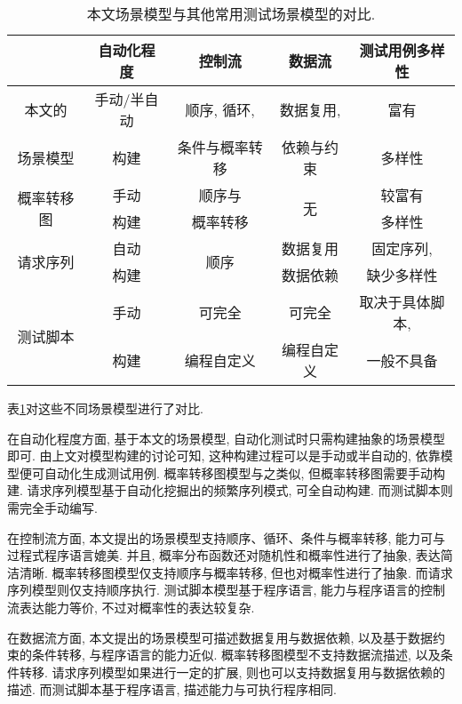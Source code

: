         \begin{table}[!htb]
            \centering
            \begin{tabular}{ccccc}
                \toprule
                 & 自动化程度 & 控制流 & 数据流 & 测试用例多样性 \\
                \midrule
                本文的 & 手动/半自动 & 顺序, 循环,  & 数据复用, & 富有 \\
                场景模型   & 构建 & 条件与概率转移 & 依赖与约束 & 多样性 \\
                \hline
                \multirow{2}{*}{概率转移图\cite{junyiw17}} & 手动 & 顺序与 & \multirow{2}{*}{无} & 较富有 \\
                & 构建 & 概率转移 &  & 多样性 \\
                \hline
                \multirow{2}{*}{请求序列\cite{taox06}\cite{xiaodongg16}} & 自动 & \multirow{2}{*}{顺序} & 数据复用 & 固定序列, \\
                & 构建 &  & 数据依赖 & 缺少多样性 \\
                \hline
                \multirow{2}{*}{测试脚本} & 手动 & 可完全 & 可完全 & 取决于具体脚本, \\
                & 构建 & 编程自定义 & 编程自定义 & 一般不具备 \\
                \bottomrule
            \end{tabular}
            \caption[本文场景模型与其他常用场景模型对比表]{本文场景模型与其他常用测试场景模型的对比.}
            \label{tab:related_work_compare}
        \end{table}
        
        表\ref{tab:related_work_compare}对这些不同场景模型进行了对比. 
        
        在自动化程度方面, 基于本文的场景模型, 自动化测试时只需构建抽象的场景模型即可. 由上文对模型构建的讨论可知, 这种构建过程可以是手动或半自动的, 依靠模型便可自动化生成测试用例. 概率转移图模型与之类似, 但概率转移图需要手动构建. 请求序列模型基于自动化挖掘出的频繁序列模式, 可全自动构建. 而测试脚本则需完全手动编写.
            
        在控制流方面, 本文提出的场景模型支持顺序、循环、条件与概率转移, 能力可与过程式程序语言媲美. 并且, 概率分布函数还对随机性和概率性进行了抽象, 表达简洁清晰. 概率转移图模型仅支持顺序与概率转移, 但也对概率性进行了抽象. 而请求序列模型则仅支持顺序执行. 测试脚本模型基于程序语言, 能力与程序语言的控制流表达能力等价, 不过对概率性的表达较复杂.
            
        在数据流方面, 本文提出的场景模型可描述数据复用与数据依赖, 以及基于数据约束的条件转移, 与程序语言的能力近似. 概率转移图模型不支持数据流描述, 以及条件转移. 请求序列模型如果进行一定的扩展, 则也可以支持数据复用与数据依赖的描述. 而测试脚本基于程序语言, 描述能力与可执行程序相同.
            
